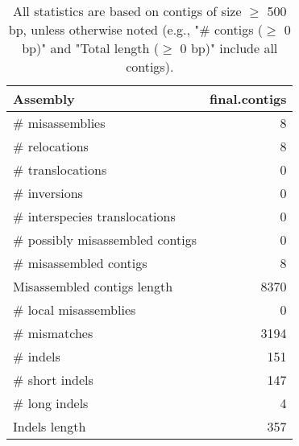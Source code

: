 \documentclass[12pt,a4paper]{article}
\begin{document}
\begin{table}[ht]
\begin{center}
\caption{All statistics are based on contigs of size $\geq$ 500 bp, unless otherwise noted (e.g., "\# contigs ($\geq$ 0 bp)" and "Total length ($\geq$ 0 bp)" include all contigs).}
\begin{tabular}{|l*{1}{|r}|}
\hline
Assembly & final.contigs \\ \hline
\# misassemblies & 8 \\ \hline
\hspace{5mm}\# relocations & 8 \\ \hline
\hspace{5mm}\# translocations & 0 \\ \hline
\hspace{5mm}\# inversions & 0 \\ \hline
\hspace{5mm}\# interspecies translocations & 0 \\ \hline
\# possibly misassembled contigs & 0 \\ \hline
\# misassembled contigs & 8 \\ \hline
Misassembled contigs length & 8370 \\ \hline
\# local misassemblies & 0 \\ \hline
\# mismatches & 3194 \\ \hline
\# indels & 151 \\ \hline
\hspace{5mm}\# short indels & 147 \\ \hline
\hspace{5mm}\# long indels & 4 \\ \hline
Indels length & 357 \\ \hline
\end{tabular}
\end{center}
\end{table}
\end{document}

